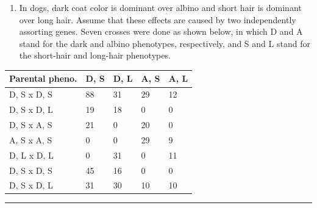 \documentclass[11pt,]{article}
\providecommand{\tightlist}{%
  \setlength{\itemsep}{0pt}\setlength{\parskip}{0pt}}
\begin{document}
\begin{blackbox}

\begin{enumerate}
\def\labelenumi{\arabic{enumi}.}
\setcounter{enumi}{27}
\tightlist
\item
  In dogs, dark coat color is dominant over albino and short hair is
  dominant over long hair. Assume that these effects are caused by two
  independently assorting genes. Seven crosses were done as shown below,
  in which D and A stand for the dark and albino phenotypes,
  respectively, and S and L stand for the short-hair and long-hair
  phenotypes.
\end{enumerate}

\hfill\break

\begin{longtable}[]{@{}lllll@{}}
\toprule
Parental pheno. & D, S & D, L & A, S & A, L\tabularnewline
\midrule
\endhead
D, S x D, S & 88 & 31 & 29 & 12\tabularnewline
D, S x D, L & 19 & 18 & 0 & 0\tabularnewline
D, S x A, S & 21 & 0 & 20 & 0\tabularnewline
A, S x A, S & 0 & 0 & 29 & 9\tabularnewline
D, L x D, L & 0 & 31 & 0 & 11\tabularnewline
D, S x D, S & 45 & 16 & 0 & 0\tabularnewline
D, S x D, L & 31 & 30 & 10 & 10\tabularnewline
\bottomrule
\end{longtable}

\begin{center}\rule{0.5\linewidth}{0.5pt}\end{center}

\vspace{12cm}

\end{blackbox}
\end{document}
